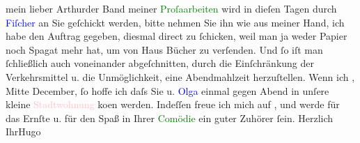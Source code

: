            mein lieber Arthur\hspace*{1.5em}der \label{K_L02280_2v}\label{K_L02280_2h}
                    Band meiner \textcolor{green}{Proſaarbeiten}{}\ledrightnote{\textcolor{green}{Die prosaischen Schriften}} wird in dieſen Tagen
                    durch \textcolor{blue}{Fiſcher}{}\ledrightnote{\textcolor{blue}{Samuel Fischer}} an Sie geſchickt werden, bitte
                    nehmen Sie ihn wie aus meiner Hand, ich habe den Auftrag gegeben, diesmal direct
                    zu ſchicken, weil man ja weder Papier noch Spagat mehr hat, um von Haus Bücher
                    zu verſenden. Und ſo iſt man ſchließlich auch voneinander abgeſchnitten, durch
                    die Einſchränkung der Verkehrsmittel u. die Unmöglichkeit, eine Abendmahlzeit
                    herzuſtellen.\pend
           \pstart
           Wenn ich \label{K_L02280_3v}\label{K_L02280_3h}, Mitte December,
                    ſo hoffe ich daſs Sie u. \textcolor{blue}{Olga}{}\ledrightnote{\textcolor{blue}{Olga Schnitzler}} einmal gegen
                    Abend in unſere kleine \textcolor{pink}{Stadtwohnung}{} ko{\geminationm}en werden. Indeſſen freue
                    ich mich auf \label{K_L02280_4v}\label{K_L02280_4h}, und werde für das
                    Ernſte u. für den Spaß in Ihrer \textcolor{green}{Comödie}{} ein guter Zuhörer ſein.\pend
           \pstart Herzlich Ihr\spacefill\mbox{Hugo}\pend{}\endnumbering{}  
      